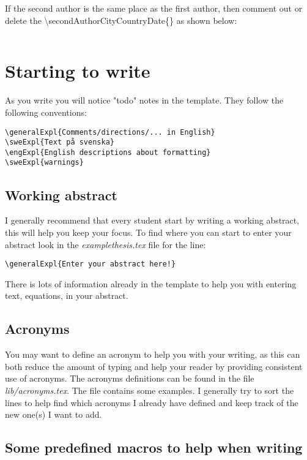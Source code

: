 \documentclass[examplethesis.tex]{subfiles}
\begin{document}
If the second author is the same place as the first author, then comment out or delete the \textbackslash secondAuthorCityCountryDate\{\} as shown below:
\begin{lstlisting}[style=latexExampleForAuthors]
%\secondAuthorCityCountryDate{}
\end{lstlisting}

\section{Starting to write}
\label{sec:startingToWrite}

As you write you will notice "todo" notes in the template. They follow the following conventions:
\begin{lstlisting}[style=latexExampleForAuthors]
\generalExpl{Comments/directions/... in English}
\sweExpl{Text på svenska}
\engExpl{English descriptions about formatting}
\sweExpl{warnings}
\end{lstlisting}


\subsection{Working abstract}
\label{sec:wrtingFirstAbstract}
I generally recommend that every student start by writing a working abstract, this will help you keep your focus. To find where you can start to enter your abstract look in the \textit{examplethesis.tex} file for the line:
\begin{lstlisting}[style=latexExampleForAuthors]
\generalExpl{Enter your abstract here!}
\end{lstlisting}

There is lots of information already in the template to help you with entering text, equations, \etc in your abstract.

\subsection{Acronyms}
\label{sec:addingAcronyms}
You may want to define an acronym to help you with your writing, as this can both reduce the amount of typing and help your reader by providing consistent use of acronyms. The acronyms definitions can be found in the file \textit{lib/acronyms.tex}. The file contains some examples. I generally try to sort the lines to help find which acronyms I already have defined and keep track of the new one(s) I want to add.

\subsection{Some predefined macros to help when writing}
\label{sec:predefine}
\end{document}
